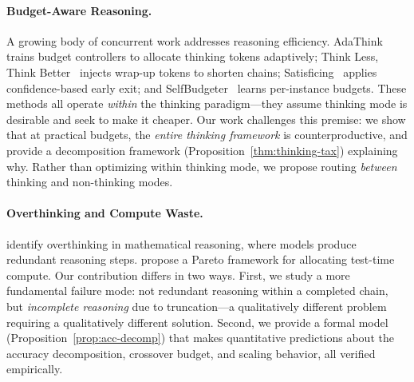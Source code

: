 \paragraph{Budget-Aware Reasoning.}
A growing body of concurrent work addresses reasoning efficiency.
AdaThink~\citep{adathink2025} trains budget controllers to allocate thinking tokens adaptively; Think Less, Think Better~\citep{hou2025thinkless} injects wrap-up tokens to shorten chains; Satisficing~\citep{luo2025satisficing} applies confidence-based early exit; and SelfBudgeter~\citep{liu2025selfbudgeter} learns per-instance budgets.
These methods all operate \emph{within} the thinking paradigm---they assume thinking mode is desirable and seek to make it cheaper.
Our work challenges this premise: we show that at practical budgets, the \emph{entire thinking framework} is counterproductive, and provide a decomposition framework (Proposition~\ref{thm:thinking-tax}) explaining why.
Rather than optimizing within thinking mode, we propose routing \emph{between} thinking and non-thinking modes.

\paragraph{Overthinking and Compute Waste.}
\citet{chen2024overthinking} identify overthinking in mathematical reasoning, where models produce redundant reasoning steps.
\citet{nvidia2025pareto} propose a Pareto framework for allocating test-time compute.
Our contribution differs in two ways.
First, we study a more fundamental failure mode: not redundant reasoning within a completed chain, but \emph{incomplete reasoning} due to truncation---a qualitatively different problem requiring a qualitatively different solution.
Second, we provide a formal model (Proposition~\ref{prop:acc-decomp}) that makes quantitative predictions about the accuracy decomposition, crossover budget, and scaling behavior, all verified empirically.

